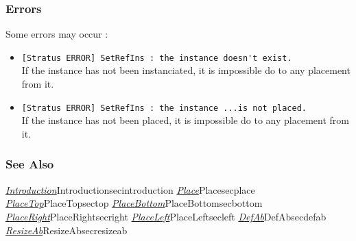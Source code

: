 \subsubsection{Errors}
    
Some errors may occur :
\begin{itemize}
    \item \verb-[Stratus ERROR] SetRefIns : the instance doesn't exist.-\\If the instance has not been instanciated, it is impossible do to any placement from it.
    \item \verb-[Stratus ERROR] SetRefIns : the instance ...is not placed.-\\If the instance has not been placed, it is impossible do to any placement from it.
\end{itemize}

\begin{htmlonly}
         
\subsubsection{See Also}

\hyperref[ref]{\emph{Introduction}}{}{Introduction}{secintroduction}
\hyperref[ref]{\emph{Place}}{}{Place}{secplace}
\hyperref[ref]{\emph{PlaceTop}}{}{PlaceTop}{sectop}
\hyperref[ref]{\emph{PlaceBottom}}{}{PlaceBottom}{secbottom}
\hyperref[ref]{\emph{PlaceRight}}{}{PlaceRight}{secright}
\hyperref[ref]{\emph{PlaceLeft}}{}{PlaceLeft}{secleft}
\hyperref[ref]{\emph{DefAb}}{}{DefAb}{secdefab}
\hyperref[ref]{\emph{ResizeAb}}{}{ResizeAb}{secresizeab}

\end{htmlonly}
